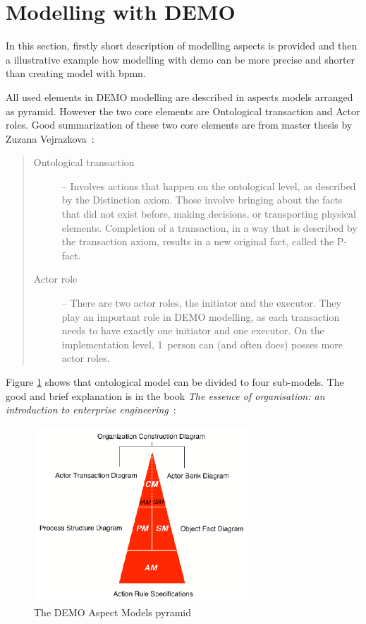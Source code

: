 \section{Modelling with DEMO}
In this section, firstly short description of modelling aspects is provided and then a illustrative example how modelling with \gls{demo} can be more precise and shorter than creating model with \gls{bpmn}. 

All used elements in DEMO modelling are described in aspects models arranged as pyramid. However the two core elements are Ontological transaction and Actor roles. Good summarization of these two core elements are from master thesis by Zuzana Vejrazkova~\cite{vejrazkova-demo-2013}:

\begin{quote}
	\begin{description}
		\item[Ontological transaction] -- Involves actions that happen on the ontological level, as described by the Distinction axiom. Those involve bringing about the facts that did not exist before, making decisions, or transporting physical elements. Completion of a transaction, in a way that is described by the transaction axiom, results in a new original fact, called the P-fact.
        \item[Actor role] -- There are two actor roles, the initiator and the executor. They play an important role in DEMO modelling, as each transaction needs to have exactly one initiator and one executor. On the implementation level, 1~person can (and often does) posses more actor roles.
	\end{description}
\end{quote}

Figure \ref{fig:DemoAspectModels} shows that ontological model can be divided to four sub-models. The good and brief explanation is in the book \textit{The essence of organisation: an introduction to enterprise engineering}~\cite{dietz-essence-2015}:

\begin{figure}[ht!]
	\centering
    \includegraphics[width=8cm, keepaspectratio]{img/DemoAspectModels}
    \caption{The DEMO Aspect Models pyramid \cite{dietz-discipline-2013}}
    \label{fig:DemoAspectModels}
\end{figure}

